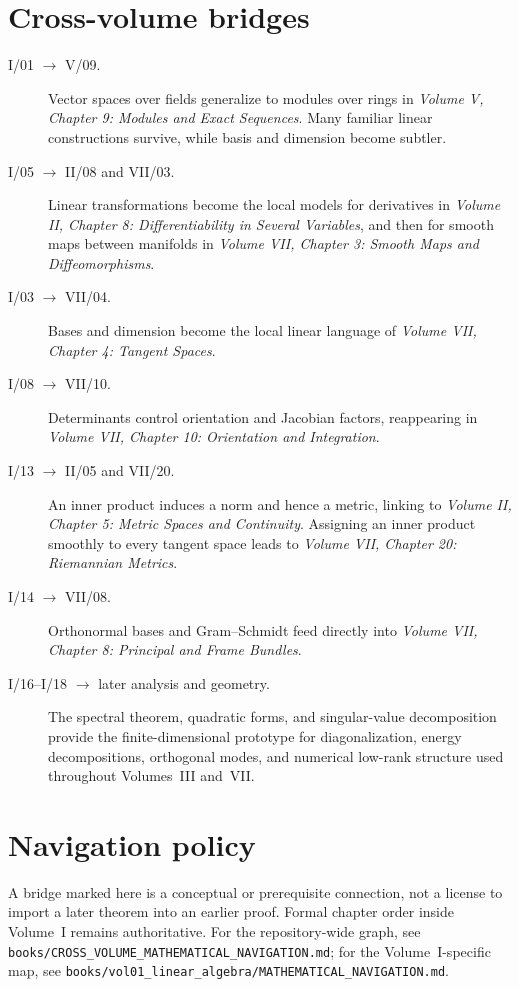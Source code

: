 \section*{Cross-volume bridges}

\begin{description}
\item[I/01 \(\rightarrow\) V/09.]
Vector spaces over fields generalize to modules over rings in
\emph{Volume V, Chapter 9: Modules and Exact Sequences}. Many familiar linear
constructions survive, while basis and dimension become subtler.

\item[I/05 \(\rightarrow\) II/08 and VII/03.]
Linear transformations become the local models for derivatives in
\emph{Volume II, Chapter 8: Differentiability in Several Variables}, and then
for smooth maps between manifolds in
\emph{Volume VII, Chapter 3: Smooth Maps and Diffeomorphisms}.

\item[I/03 \(\rightarrow\) VII/04.]
Bases and dimension become the local linear language of
\emph{Volume VII, Chapter 4: Tangent Spaces}.

\item[I/08 \(\rightarrow\) VII/10.]
Determinants control orientation and Jacobian factors, reappearing in
\emph{Volume VII, Chapter 10: Orientation and Integration}.

\item[I/13 \(\rightarrow\) II/05 and VII/20.]
An inner product induces a norm and hence a metric, linking to
\emph{Volume II, Chapter 5: Metric Spaces and Continuity}. Assigning an inner
product smoothly to every tangent space leads to
\emph{Volume VII, Chapter 20: Riemannian Metrics}.

\item[I/14 \(\rightarrow\) VII/08.]
Orthonormal bases and Gram--Schmidt feed directly into
\emph{Volume VII, Chapter 8: Principal and Frame Bundles}.

\item[I/16--I/18 \(\rightarrow\) later analysis and geometry.]
The spectral theorem, quadratic forms, and singular-value decomposition
provide the finite-dimensional prototype for diagonalization, energy
decompositions, orthogonal modes, and numerical low-rank structure used
throughout Volumes~III and~VII.
\end{description}

\section*{Navigation policy}

A bridge marked here is a conceptual or prerequisite connection, not a license
to import a later theorem into an earlier proof. Formal chapter order inside
Volume~I remains authoritative. For the repository-wide graph, see
\texttt{books/CROSS\_VOLUME\_MATHEMATICAL\_NAVIGATION.md}; for the
Volume~I-specific map, see
\texttt{books/vol01\_linear\_algebra/MATHEMATICAL\_NAVIGATION.md}.
